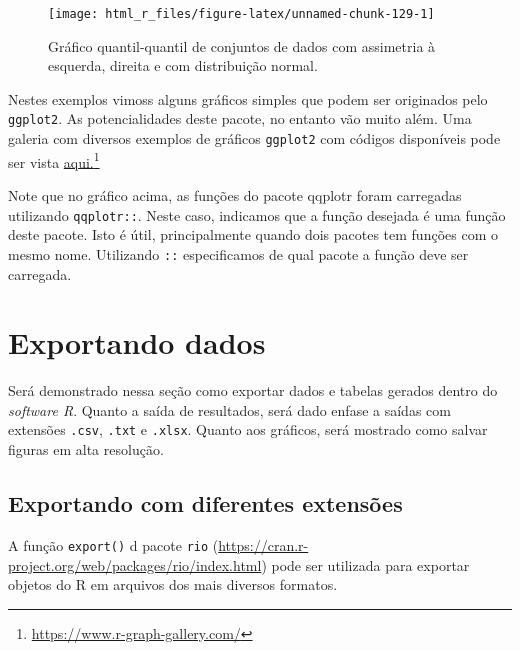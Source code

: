 \documentclass[
]{book}
\begin{document}
\begin{figure}

{\centering \texttt{[image: html\_r\_files/figure-latex/unnamed-chunk-129-1]} 

}

\caption{Gráfico quantil-quantil de conjuntos de dados com assimetria à esquerda, direita e com distribuição normal.}\label{fig:unnamed-chunk-129}
\end{figure}

   
Nestes exemplos vimoss alguns gráficos simples que podem ser originados pelo \texttt{ggplot2}. As potencialidades deste pacote, no entanto vão muito além. Uma galeria com diversos exemplos de gráficos \texttt{ggplot2} com códigos disponíveis pode ser vista \href{https://www.r-graph-gallery.com/}{aqui.}\footnote{\url{https://www.r-graph-gallery.com/}}

\begin{dica}
Note que no gráfico acima, as funções do pacote qqplotr foram carregadas utilizando \texttt{qqplotr::}. Neste caso, indicamos que a função desejada é uma função deste pacote. Isto é útil, principalmente quando dois pacotes tem funções com o mesmo nome. Utilizando \texttt{::} especificamos de qual pacote a função deve ser carregada.
\end{dica}

\hypertarget{exporta}{%
\chapter{Exportando dados}\label{exporta}}

Será demonstrado nessa seção como exportar dados e tabelas gerados dentro do \emph{software R}. Quanto a saída de resultados, será dado enfase a saídas com extensões \texttt{.csv}, \texttt{.txt} e \texttt{.xlsx}. Quanto aos gráficos, será mostrado como salvar figuras em alta resolução.

\hypertarget{exportando-com-diferentes-extensuxf5es}{%
\section{Exportando com diferentes extensões}\label{exportando-com-diferentes-extensuxf5es}}

A função \texttt{export()} d pacote \texttt{rio} (\url{https://cran.r-project.org/web/packages/rio/index.html}) pode ser utilizada para exportar objetos do R em arquivos dos mais diversos formatos.
\end{document}
